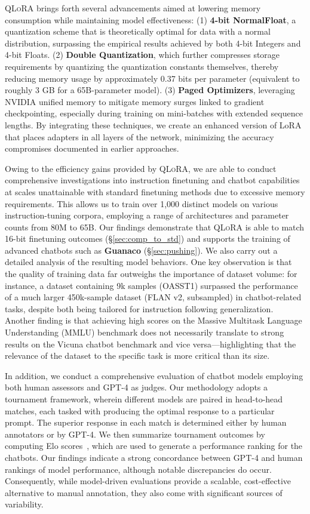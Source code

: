 \textsc{QLoRA} brings forth several advancements aimed at lowering memory consumption while maintaining model effectiveness: (1) \textbf{4-bit NormalFloat}, a quantization scheme that is theoretically optimal for data with a normal distribution, surpassing the empirical results achieved by both 4-bit Integers and 4-bit Floats. (2) \textbf{Double Quantization}, which further compresses storage requirements by quantizing the quantization constants themselves, thereby reducing memory usage by approximately 0.37 bits per parameter (equivalent to roughly 3 GB for a 65B-parameter model). (3) \textbf{Paged Optimizers}, leveraging NVIDIA unified memory to mitigate memory surges linked to gradient checkpointing, especially during training on mini-batches with extended sequence lengths. By integrating these techniques, we create an enhanced version of LoRA that places adapters in all layers of the network, minimizing the accuracy compromises documented in earlier approaches.

Owing to the efficiency gains provided by \textsc{QLoRA}, we are able to conduct comprehensive investigations into instruction finetuning and chatbot capabilities at scales unattainable with standard finetuning methods due to excessive memory requirements. This allows us to train over 1,000 distinct models on various instruction-tuning corpora, employing a range of architectures and parameter counts from 80M to 65B. Our findings demonstrate that \textsc{QLoRA} is able to match 16-bit finetuning outcomes (\S\ref{sec:comp_to_std}) and supports the training of advanced chatbots such as \textbf{Guanaco} (\S\ref{sec:pushing}). We also carry out a detailed analysis of the resulting model behaviors. One key observation is that the quality of training data far outweighs the importance of dataset volume: for instance, a dataset containing 9k samples (OASST1) surpassed the performance of a much larger 450k-sample dataset (FLAN v2, subsampled) in chatbot-related tasks, despite both being tailored for instruction following generalization. Another finding is that achieving high scores on the Massive Multitask Language Understanding (MMLU) benchmark does not necessarily translate to strong results on the Vicuna chatbot benchmark and vice versa—highlighting that the relevance of the dataset to the specific task is more critical than its size.

In addition, we conduct a comprehensive evaluation of chatbot models employing both human assessors and GPT-4 as judges. Our methodology adopts a tournament framework, wherein different models are paired in head-to-head matches, each tasked with producing the optimal response to a particular prompt. The superior response in each match is determined either by human annotators or by GPT-4. We then summarize tournament outcomes by computing Elo scores~\citep{elo1967proposed, elo1978rating}, which are used to generate a performance ranking for the chatbots. Our findings indicate a strong concordance between GPT-4 and human rankings of model performance, although notable discrepancies do occur. Consequently, while model-driven evaluations provide a scalable, cost-effective alternative to manual annotation, they also come with significant sources of variability.

